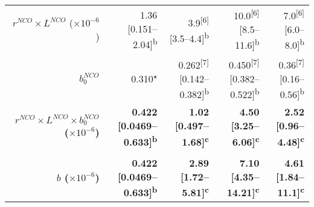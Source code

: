 \begin{sidewaystable}[p]
\begin{adjustbox}{width=\textwidth}
\begin{tabular}{rrrrr}
        $r^{NCO} \times L^{NCO}$ ($\times 10^{-6}$)    & 1.36 [0.151--2.04]\textsuperscript{b} & 3.9\textsuperscript{[6]} [3.5--4.4]\textsuperscript{b} & 10.0\textsuperscript{[6]} [8.5--11.6]\textsuperscript{b} & 7.0\textsuperscript{[6]} [6.0--8.0]\textsuperscript{b} \\
        $b_0^{NCO}$         & 0.310\textsuperscript{$\star$} & 0.262\textsuperscript{[7]} [0.142--0.382]\textsuperscript{b} & 0.450\textsuperscript{[7]} [0.382--0.522]\textsuperscript{b} & 0.36\textsuperscript{[7]} [0.16--0.56]\textsuperscript{b} \\
        \textbf{$r^{NCO} \times L^{NCO} \times b_0^{NCO}$ ($\times 10^{-6}$)}   & \textbf{0.422 [0.0469--0.633]\textsuperscript{b}} & \textbf{1.02 [0.497--1.68]\textsuperscript{c}} & \textbf{4.50 [3.25--6.06]\textsuperscript{c}} & \textbf{2.52 [0.96--4.48]\textsuperscript{c}} \\
        \\
		\midrule
        
        \textbf{$b$ ($\times 10^{-6}$)} & \textbf{0.422 [0.0469--0.633]\textsuperscript{b} } & \textbf{2.89 [1.72--5.81]\textsuperscript{c} } & \textbf{7.10 [4.35--14.21]\textsuperscript{c} } & \textbf{4.61 [1.84--11.1]\textsuperscript{c} } \\
        
        \bottomrule
        

\end{tabular}
\end{adjustbox}
\end{sidewaystable}
